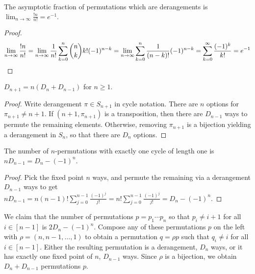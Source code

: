 \documentclass[a4paper]{article}
\begin{document}
\begin{corollary}
The asymptotic fraction of permutations which are derangements is $\displaystyle\lim_{n\rightarrow\infty}\frac{!n}{n!}=e^{-1}$.

\begin{hl}
\begin{proof}
\begin{equation*}
\lim_{n\rightarrow\infty}\frac{!n}{n!}
=\lim_{n\rightarrow\infty}\frac1{n!}\sum_{k=0}^n\binom nkk!(-1)^{n-k}
=\lim_{n\rightarrow\infty}\sum_{k=0}^n\frac1{(n-k)!}(-1)^{n-k}
=\sum_{k=0}^{\infty}\frac{(-1)^{k}}{k!}
=e^{-1}\qedhere
\end{equation*}
\end{proof}
\end{hl}
\end{corollary}

\begin{lemma}
$D_{n+1}=n(D_n+D_{n-1})$ for $n\geq1$.

\begin{hl}
\begin{proof}
Write derangement $\pi\in S_{n+1}$ in cycle notation. There are $n$ options for $\pi_{n+1}\neq n+1$. If $(n+1,\pi_{n+1})$ is a transposition, then there are $D_{n-1}$ ways to permute the remaining elements. Otherwise, removing $\pi_{n+1}$ is a bijection yielding a derangement in $S_n$, so that there are $D_n$ options.
\end{proof}
\end{hl}
\end{lemma}

\begin{lemma}\label{one_fixed_point}
The number of $n$-permutations with exactly one cycle of length one is $nD_{n-1}=D_n-(-1)^n$.

\begin{hl}
\begin{proof}
Pick the fixed point $n$ ways, and permute the remaining via a derangement $D_{n-1}$ ways to get $nD_{n-1}=n(n-1)!\sum_{j=0}^{n-1}\frac{(-1)^j}{j!}=n!\sum_{j=0}^{n-1}\frac{(-1)^j}{j!}=D_n-(-1)^n$.
\end{proof}
\end{hl}
\end{lemma}

\begin{example}
We claim that the number of permutations $p=p_1\cdots p_n$ so that $p_i\neq i+1$ for all $i\in[n-1]$ is $2D_n-(-1)^n$. Compose any of these permutations $p$ on the left with $\rho=(n,n-1,\dots,1)$ to obtain a permutation $q=\rho p$ such that $q_i\neq i$ for all $i\in[n-1]$. Either the resulting permutation is a derangement, $D_n$ ways, or it has exactly one fixed point of $n$, $D_{n-1}$ ways. Since $\rho$ is a bijection, we obtain $D_n+D_{n-1}$ permutations $p$.
\end{example}
\end{document}
